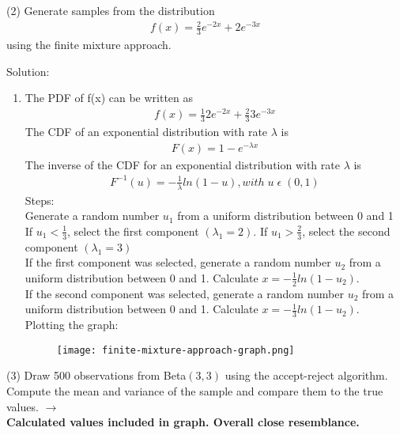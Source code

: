 \documentclass[final,11pt]{article}
\begin{document}
\begin{spacing}{1.25}
\newpage

(2) Generate samples from the distribution
\begin{gather}
    f(x)=\frac{2}{3}e^{-2x}+2e^{-3x}
\end{gather}
using the finite mixture approach.

{\color{red}
Solution:
\begin{enumerate}
    \item The PDF of f(x) can be written as 
    \begin{gather}
        f(x) = \frac{1}{3}2e^{-2x} + \frac{2}{3}3e^{-3x}
    \end{gather}
    The CDF of an exponential distribution with rate $\lambda$ is 
    \begin{gather}
        F(x) = 1-e^{-\lambda x}
    \end{gather}
    The inverse of the CDF for an exponential distribution with rate $\lambda$ is 
    \begin{gather}
        F^{-1}(u) = -\frac{1}{\lambda} ln(1-u), with \; u \; \epsilon \; (0,1) 
    \end{gather}
    Steps: \\
    Generate a random number $u_1$ from a uniform distribution between 0 and 1 \\
    If $u_1 < \frac{1}{3}$, select the first component $(\lambda_1 = 2)$. If $u_1 > \frac{2}{3}$, select the second component $(\lambda_1 = 3)$ \\
    If the first component was selected, generate a random number $u_2$ from a uniform distribution between 0 and 1. Calculate $x = - \frac{1}{2} ln(1-u_2)$.\\
    If the second component was selected, generate a random number $u_2$ from a uniform distribution between 0 and 1. Calculate $x = - \frac{1}{3} ln(1-u_2)$.\\

    Plotting the graph:
\begin{figure} [H]
    \centering
    \texttt{[image: finite-mixture-approach-graph.png]}
    \label{fig:enter-label}
\end{figure}

\end{enumerate}
}


(3) Draw 500 observations from Beta$(3,3)$ using the accept-reject algorithm. Compute the mean and variance of the sample and compare them to the true values. $\to$ \\  \textbf{ Calculated values included in graph. Overall close resemblance.}\\


\end{spacing}
\end{document}
